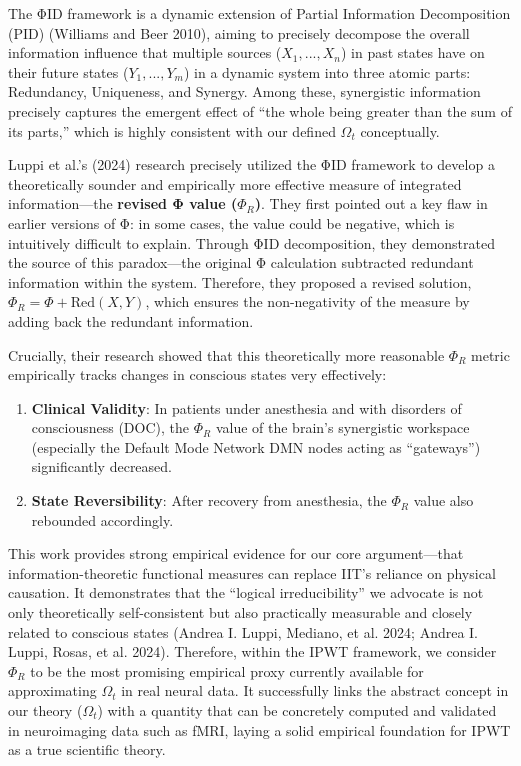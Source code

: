 \documentclass[
  a4paper]{article}
\providecommand{\tightlist}{%
  \setlength{\itemsep}{0pt}\setlength{\parskip}{0pt}}
\begin{document}
The ΦID framework is a dynamic extension of Partial Information
Decomposition (PID) (Williams and Beer 2010), aiming to precisely
decompose the overall information influence that multiple sources
(\(X_1, ..., X_n\)) in past states have on their future states
(\(Y_1, ..., Y_m\)) in a dynamic system into three atomic parts:
Redundancy, Uniqueness, and Synergy. Among these, synergistic
information precisely captures the emergent effect of ``the whole being
greater than the sum of its parts,'' which is highly consistent with our
defined \(\Omega_t\) conceptually.

Luppi et al.'s (2024) research precisely utilized the ΦID framework to
develop a theoretically sounder and empirically more effective measure
of integrated information---the \textbf{revised Φ value (\(\Phi_R\))}.
They first pointed out a key flaw in earlier versions of Φ: in some
cases, the value could be negative, which is intuitively difficult to
explain. Through ΦID decomposition, they demonstrated the source of this
paradox---the original Φ calculation subtracted redundant information
within the system. Therefore, they proposed a revised solution,
\(\Phi_R = \Phi + \mathrm{Red}(X, Y)\), which ensures the non-negativity
of the measure by adding back the redundant information.

Crucially, their research showed that this theoretically more reasonable
\(\Phi_R\) metric empirically tracks changes in conscious states very
effectively:

\begin{enumerate}
\def\labelenumi{\arabic{enumi}.}
\tightlist
\item
  \textbf{Clinical Validity}: In patients under anesthesia and with
  disorders of consciousness (DOC), the \(\Phi_R\) value of the brain's
  synergistic workspace (especially the Default Mode Network DMN nodes
  acting as ``gateways'') significantly decreased.
\item
  \textbf{State Reversibility}: After recovery from anesthesia, the
  \(\Phi_R\) value also rebounded accordingly.
\end{enumerate}

This work provides strong empirical evidence for our core
argument---that information-theoretic functional measures can replace
IIT's reliance on physical causation. It demonstrates that the ``logical
irreducibility'' we advocate is not only theoretically self-consistent
but also practically measurable and closely related to conscious states
(Andrea I. Luppi, Mediano, et al. 2024; Andrea I. Luppi, Rosas, et al.
2024). Therefore, within the IPWT framework, we consider \(\Phi_R\) to
be the most promising empirical proxy currently available for
approximating \(\Omega_t\) in real neural data. It successfully links
the abstract concept in our theory (\(\Omega_t\)) with a quantity that
can be concretely computed and validated in neuroimaging data such as
fMRI, laying a solid empirical foundation for IPWT as a true scientific
theory.
\end{document}
